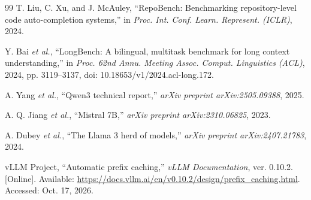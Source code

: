 \begin{thebibliography}{99}
T. Liu, C. Xu, and J. McAuley, ``RepoBench: Benchmarking repository-level code auto-completion systems,'' in \emph{Proc. Int. Conf. Learn. Represent. (ICLR)}, 2024.

Y. Bai \emph{et al.}, ``LongBench: A bilingual, multitask benchmark for long context understanding,'' in \emph{Proc. 62nd Annu. Meeting Assoc. Comput. Linguistics (ACL)}, 2024, pp. 3119--3137, doi: 10.18653/v1/2024.acl-long.172.

A. Yang \emph{et al.}, ``Qwen3 technical report,'' \emph{arXiv preprint arXiv:2505.09388}, 2025.

A. Q. Jiang \emph{et al.}, ``Mistral 7B,'' \emph{arXiv preprint arXiv:2310.06825}, 2023.

A. Dubey \emph{et al.}, ``The Llama 3 herd of models,'' \emph{arXiv preprint arXiv:2407.21783}, 2024.

vLLM Project, ``Automatic prefix caching,'' \emph{vLLM Documentation}, ver. 0.10.2. [Online]. Available: \url{https://docs.vllm.ai/en/v0.10.2/design/prefix_caching.html}. Accessed: Oct. 17, 2026.

\end{thebibliography}
